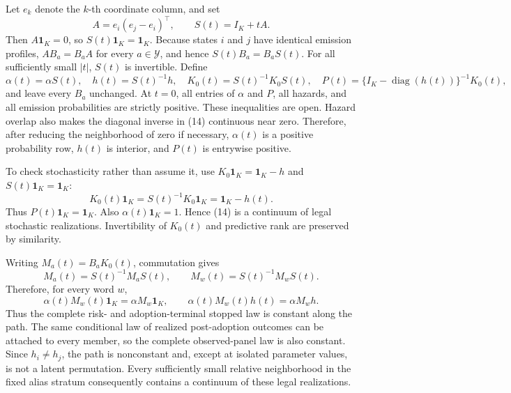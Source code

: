 Let \(e_k\) denote the \(k\)-th coordinate column, and set
\[
 A=e_i(e_j-e_i)^{\top},\qquad S(t)=I_K+tA.
\]
Then \(A\mathbf 1_K=0\), so \(S(t)\mathbf 1_K=\mathbf 1_K\).  Because states \(i\) and \(j\) have identical emission profiles, \(A B_a=B_a A\) for every \(a\in\mathcal Y\), and hence \(S(t)B_a=B_aS(t)\).  For all sufficiently small \(|t|\), \(S(t)\) is invertible.  Define
\[
 \alpha(t)=\alpha S(t),\quad h(t)=S(t)^{-1}h,
 \quad K_0(t)=S(t)^{-1}K_0S(t),
 \quad P(t)=\{I_K-\operatorname{diag}(h(t))\}^{-1}K_0(t),       \tag{14}
\]
and leave every \(B_a\) unchanged.  At \(t=0\), all entries of \(\alpha\) and \(P\), all hazards, and all emission probabilities are strictly positive.  These inequalities are open.  Hazard overlap also makes the diagonal inverse in (14) continuous near zero.  Therefore, after reducing the neighborhood of zero if necessary, \(\alpha(t)\) is a positive probability row, \(h(t)\) is interior, and \(P(t)\) is entrywise positive.

To check stochasticity rather than assume it, use \(K_0\mathbf 1_K=\mathbf 1_K-h\) and \(S(t)\mathbf 1_K=\mathbf 1_K\):
\[
 K_0(t)\mathbf 1_K
 =S(t)^{-1}K_0\mathbf 1_K
 =\mathbf 1_K-h(t).
\]
Thus \(P(t)\mathbf 1_K=\mathbf 1_K\).  Also \(\alpha(t)\mathbf 1_K=1\).  Hence (14) is a continuum of legal stochastic realizations.  Invertibility of \(K_0(t)\) and predictive rank are preserved by similarity.

Writing \(M_a(t)=B_aK_0(t)\), commutation gives
\[
 M_a(t)=S(t)^{-1}M_aS(t),
 \qquad
 M_w(t)=S(t)^{-1}M_wS(t).                                    \tag{15}
\]
Therefore, for every word \(w\),
\[
 \alpha(t)M_w(t)\mathbf 1_K=\alpha M_w\mathbf 1_K,
 \qquad
 \alpha(t)M_w(t)h(t)=\alpha M_wh.                            \tag{16}
\]
Thus the complete risk- and adoption-terminal stopped law is constant along the path.  The same conditional law of realized post-adoption outcomes can be attached to every member, so the complete observed-panel law is also constant.  Since \(h_i\ne h_j\), the path is nonconstant and, except at isolated parameter values, is not a latent permutation.  Every sufficiently small relative neighborhood in the fixed alias stratum consequently contains a continuum of these legal realizations.

